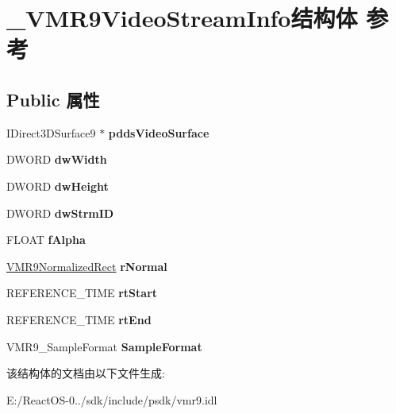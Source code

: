 \hypertarget{struct___v_m_r9_video_stream_info}{}\section{\+\_\+\+V\+M\+R9\+Video\+Stream\+Info结构体 参考}
\label{struct___v_m_r9_video_stream_info}
\subsection*{Public 属性}
\begin{DoxyCompactItemize}
\item 
\mbox{\label{struct___v_m_r9_video_stream_info_a45bb191c6a8e20315cfd05a6e50c2958}} 
I\+Direct3\+D\+Surface9 $\ast$ {\bfseries pdds\+Video\+Surface}
\item 
\mbox{\label{struct___v_m_r9_video_stream_info_a6405e043aa0fb063eadb65fd236dbe4a}} 
D\+W\+O\+RD {\bfseries dw\+Width}
\item 
\mbox{\label{struct___v_m_r9_video_stream_info_a0e2f4ffe53ccc6cd40b7d9e2030056a9}} 
D\+W\+O\+RD {\bfseries dw\+Height}
\item 
\mbox{\label{struct___v_m_r9_video_stream_info_ae299ed17bf9db64f757b3a81ed11e7cc}} 
D\+W\+O\+RD {\bfseries dw\+Strm\+ID}
\item 
\mbox{\label{struct___v_m_r9_video_stream_info_a5678f1eca49d1342058e8204f055cec1}} 
F\+L\+O\+AT {\bfseries f\+Alpha}
\item 
\mbox{\label{struct___v_m_r9_video_stream_info_add179cddf544126e892af97190cde280}} 
\hyperlink{struct___v_m_r9_normalized_rect}{V\+M\+R9\+Normalized\+Rect} {\bfseries r\+Normal}
\item 
\mbox{\label{struct___v_m_r9_video_stream_info_ae2d849ac6b81ade9ceb1eea4cab06a66}} 
R\+E\+F\+E\+R\+E\+N\+C\+E\+\_\+\+T\+I\+ME {\bfseries rt\+Start}
\item 
\mbox{\label{struct___v_m_r9_video_stream_info_a9a20789b079e5efc234e9b007d959258}} 
R\+E\+F\+E\+R\+E\+N\+C\+E\+\_\+\+T\+I\+ME {\bfseries rt\+End}
\item 
\mbox{\label{struct___v_m_r9_video_stream_info_accf8361482ae3b0d622d04b478c4eb3f}} 
V\+M\+R9\+\_\+\+Sample\+Format {\bfseries Sample\+Format}
\end{DoxyCompactItemize}


该结构体的文档由以下文件生成\+:\begin{DoxyCompactItemize}
\item 
E\+:/\+React\+O\+S-\/0../sdk/include/psdk/vmr9.\+idl\end{DoxyCompactItemize}
